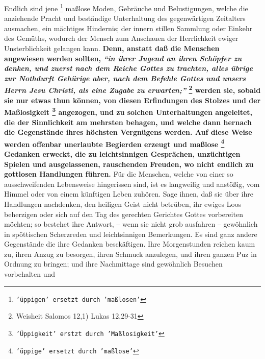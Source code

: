 Endlich sind jene \footnote{\texttt{'üppigen' ersetzt durch 'maßlosen'}}
maßlose Moden, Gebräuche und Belustigungen, welche die
anziehende Pracht und beständige Unterhaltung des gegenwärtigen Zeitalters
ausmachen, ein mächtiges Hindernis; der innern stillen Sammlung oder Einkehr des
Gemüths, wodurch der Mensch zum Anschauen der Herrlichkeit ewiger
Unsterblichkeit gelangen kann.
\label{ref:17_01_erziehung}
\textbf{Denn, anstatt daß die Menschen angewiesen werden
sollten,
\textit{"`in ihrer Jugend an ihren Schöpfer zu denken, und zuerst nach dem
Reiche Gottes zu trachten, alles übrige zur Nothdurft
Gehürige aber, nach dem
Befehle Gottes und unsers Herrn Jesu Christi, als eine Zugabe zu
erwarten;"'}
\footnote{Weisheit Salomos 12,1) Lukas  12,29-31}
werden sie, sobald sie nur
etwas thun können, von diesen Erfindungen des Stolzes und der Maßlosigkeit
\footnote{\texttt{'Üppigkeit' erstzt durch 'Maßlosigkeit'}}
angezogen, und zu solchen Unterhaltungen angeleitet, die der Sinnlichkeit am
mehrsten behagen, und welche dann hernach die Gegenstände ihres höchsten
Vergnügens werden. Auf diese Weise werden offenbar unerlaubte Begierden erzeugt
und maßlose
\footnote{\texttt{'üppige' ersetzt durch 'maßlose'}} Gedanken erweckt, die zu
leichtsinnigen Gesprächen, unzüchtigen
Spielen und ausgelassenen, rauschenden Freuden, wo nicht endlich zu gottlosen
Handlungen führen.} Für die Menschen, welche von einer so ausschweifenden
Lebensweise hingerissen sind, ist es langweilig und anstößig, vom Himmel oder
von einem künftigen Leben zuhören. Sage ihnen, daß sie über ihre Handlungen
nachdenken, den heiligen Geist nicht betrüben, ihr ewiges
Loos beherzigen oder
sich auf den Tag des gerechten Gerichtes Gottes
vorbereiten möchten; so bestehet
ihre Antwort, -- wenn sie nicht grob ausfahren -- gewöhnlich in spöttischen
Scherzreden und leichtsinnigen Bemerkungen. Es sind ganz andere Gegenstände die
ihre Gedanken besckäftigen. Ihre Morgenstunden reichen kaum zu, ihren Anzug zu
besorgen, ihren Schmuck anzulegen, und ihren ganzen Puz in Ordnung zu bringen;
und ihre Nachmittage sind gewöhnlich Besuchen vorbehalten und
\label{ref:17_01_schauspiel}
